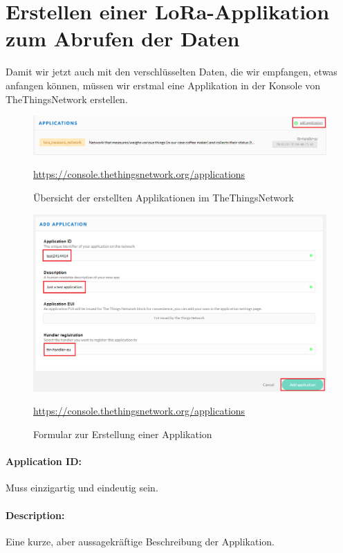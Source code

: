 \section{Erstellen einer LoRa-Applikation zum Abrufen der Daten}
Damit wir jetzt auch mit den verschlüsselten Daten, die wir empfangen, etwas anfangen können, müssen wir erstmal eine Applikation in der Konsole von TheThingsNetwork erstellen. 
\begin{figure}[ht]
    \center
    \includegraphics[width=16cm]{Bilder/lora-2.png}\\
    \caption{Übersicht der erstellten Applikationen im TheThingsNetwork}
    \begin{center} \quelle\url{https://console.thethingsnetwork.org/applications} \end{center}
\end{figure}
\begin{figure}[ht]
    \center
    \includegraphics[width=16cm]{Bilder/lora-3.png}\\
    \caption{Formular zur Erstellung einer Applikation}
    \begin{center} \quelle\url{https://console.thethingsnetwork.org/applications} \end{center}
\end{figure}
\newpage
\paragraph{Application ID:} Muss einzigartig und eindeutig sein.
\paragraph{Description:} Eine kurze, aber aussagekräftige Beschreibung der Applikation.
